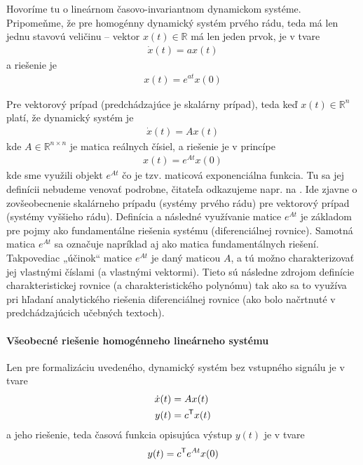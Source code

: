 \documentclass[a4paper, 10pt, ]{article}
\begin{document}
Hovoríme tu o lineárnom časovo-invariantnom dynamickom systéme. Pripomeňme, že pre homogénny dynamický systém prvého rádu, teda má len jednu stavovú veličinu -- vektor $x(t)\in\mathbb R$ má len jeden prvok, je v tvare
\begin{align}
	\dot x(t) = a x(t)
\end{align}
a riešenie je
\begin{align}
	x(t) = e^{at} x(0)
\end{align}



Pre vektorový prípad (predchádzajúce je skalárny prípad), teda keď $x(t)\in\mathbb R^n$ platí, že dynamický systém je
\begin{align}
	\dot x(t) = A x(t)
\end{align}
kde $A \in\mathbb R^{n\times n}$ je matica reálnych čísiel, a riešenie je v princípe
\begin{align}
	x(t) = e^{At} x(0)
\end{align}
kde sme využili objekt $e^{At}$ čo je tzv. maticová exponenciálna funkcia. Tu sa jej definícii nebudeme venovať podrobne, čitateľa odkazujeme napr. na \cite{AsM08se}. Ide zjavne o zovšeobecnenie skalárneho prípadu (systémy prvého rádu) pre vektorový prípad (systémy vyššieho rádu). Definícia a následné využívanie matice $e^{At}$ je základom pre pojmy ako fundamentálne riešenia systému (diferenciálnej rovnice). Samotná matica $e^{At}$ sa označuje napríklad aj ako matica fundamentálnych riešení. Takpovediac „účinok“ matice $e^{At}$ je daný maticou $A$, a tú možno charakterizovať jej vlastnými číslami (a vlastnými vektormi). Tieto sú následne zdrojom definície charakteristickej rovnice (a charakteristického polynómu) tak ako sa to využíva pri hľadaní analytického riešenia diferenciálnej rovnice (ako bolo načrtnuté v predchádzajúcich učebných textoch).




\paragraph{Všeobecné riešenie homogénneho lineárneho systému}

Len pre formalizáciu uvedeného, dynamický systém bez vstupného signálu je v tvare
\begin{subequations}
\begin{align}
	\dot x(t) &= A x(t) \\
	y(t) &= c^{\mathsf{T}} x(t)
\end{align}
\end{subequations}
a jeho riešenie, teda časová funkcia opisujúca výstup $y(t)$ je v tvare
\begin{align}
	y(t) = c^{\mathsf{T}} e^{At} x(0)
\end{align}
\end{document}
